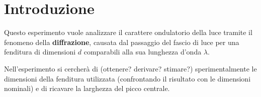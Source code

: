 \documentclass[../main.tex]{subfiles}
\begin{document}
\section{Introduzione}

Questo esperimento vuole analizzare il carattere ondulatorio della luce tramite il fenomeno della \textbf{diffrazione}, causata dal passaggio del fascio di luce per una fenditura di dimensioni $d$ comparabili alla sua lunghezza d'onda $\lambda$.



\noindent Nell'esperimento si cercherà di ({\color{red}ottenere? derivare? stimare?}) sperimentalmente le dimensioni della fenditura utilizzata (confrontando il risultato con le dimensioni nominali) e di ricavare la larghezza del picco centrale. %
\end{document}
